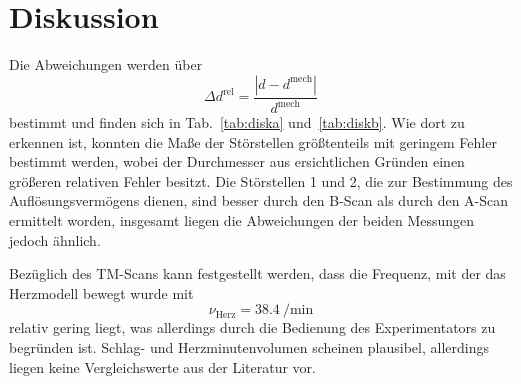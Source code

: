 \section{Diskussion}
\label{sec:Diskussion}
Die Abweichungen werden über
\begin{equation}
  \Delta d^\text{rel} = \frac{|d - d^\text{mech}|}{d^\text{mech}}
\end{equation}
bestimmt und finden sich in Tab.~\ref{tab:diska} und~\ref{tab:diskb}. Wie dort zu erkennen ist, konnten die Maße der Störstellen größtenteils mit geringem Fehler bestimmt werden, wobei der Durchmesser aus ersichtlichen Gründen einen größeren relativen Fehler besitzt. Die Störstellen 1 und 2, die zur Bestimmung des Auflösungsvermögens dienen, sind besser durch den B-Scan als durch den A-Scan ermittelt worden, insgesamt liegen die Abweichungen der beiden Messungen jedoch ähnlich.



Bezüglich des TM-Scans kann festgestellt werden, dass die Frequenz, mit der das Herzmodell bewegt wurde mit
\begin{equation*}
  \nu_\text{Herz} = \SI{38.4}{\per\minute}
\end{equation*}
relativ gering liegt, was allerdings durch die Bedienung des Experimentators zu begründen ist. Schlag- und Herzminutenvolumen scheinen plausibel, allerdings liegen keine Vergleichswerte aus der Literatur vor.
